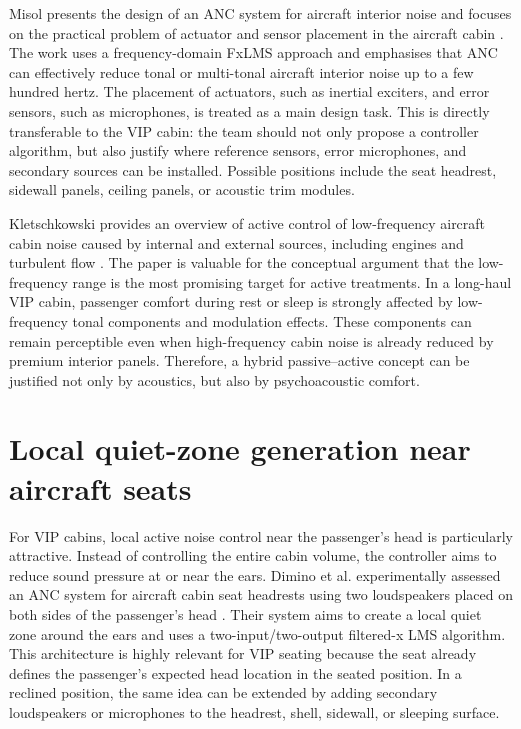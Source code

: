 Misol presents the design of an ANC system for aircraft interior noise and focuses on the practical problem of actuator and sensor placement in the aircraft cabin \cite{misol2023design}. The work uses a frequency-domain FxLMS approach and emphasises that ANC can effectively reduce tonal or multi-tonal aircraft interior noise up to a few hundred hertz. The placement of actuators, such as inertial exciters, and error sensors, such as microphones, is treated as a main design task. This is directly transferable to the VIP cabin: the team should not only propose a controller algorithm, but also justify where reference sensors, error microphones, and secondary sources can be installed. Possible positions include the seat headrest, sidewall panels, ceiling panels, or acoustic trim modules.

Kletschkowski provides an overview of active control of low-frequency aircraft cabin noise caused by internal and external sources, including engines and turbulent flow \cite{kletschkowski2020insights}. The paper is valuable for the conceptual argument that the low-frequency range is the most promising target for active treatments. In a long-haul VIP cabin, passenger comfort during rest or sleep is strongly affected by low-frequency tonal components and modulation effects. These components can remain perceptible even when high-frequency cabin noise is already reduced by premium interior panels. Therefore, a hybrid passive--active concept can be justified not only by acoustics, but also by psychoacoustic comfort.

\section{Local quiet-zone generation near aircraft seats}
\label{sec:local-quiet-zones}

For VIP cabins, local active noise control near the passenger's head is particularly attractive. Instead of controlling the entire cabin volume, the controller aims to reduce sound pressure at or near the ears. Dimino et al. experimentally assessed an ANC system for aircraft cabin seat headrests using two loudspeakers placed on both sides of the passenger's head \cite{dimino2022active}. Their system aims to create a local quiet zone around the ears and uses a two-input/two-output filtered-x LMS algorithm. This architecture is highly relevant for VIP seating because the seat already defines the passenger's expected head location in the seated position. In a reclined position, the same idea can be extended by adding secondary loudspeakers or microphones to the headrest, shell, sidewall, or sleeping surface.

